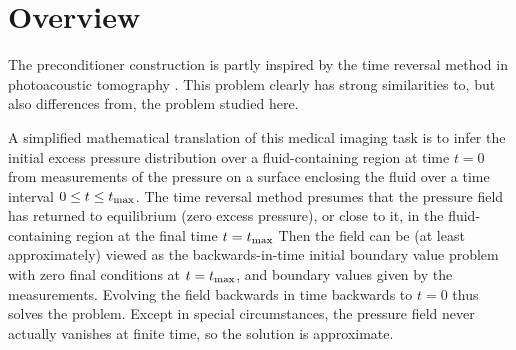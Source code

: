 \documentclass[georeport,12pt]{geophysics}
\newcommand{\bff}{\mathbf{f}}
\newcommand{\bu}{\mathbf{u}}
\begin{document}

\section{Overview}

The preconditioner construction is partly inspired by the time
reversal method in photoacoustic tomography
\cite[]{StefanovUhlmannIP:09,Hristova:09}. This problem
clearly has strong similarities to, but also differences from, the
problem studied here.

A simplified mathematical
translation of this medical imaging task is to infer the initial
excess pressure distribution over a fluid-containing region at time
$t=0$ from measurements of the pressure on a surface enclosing the
fluid over a time interval $0 \le t \le t_{\rm max}$. The time reversal method presumes that the
pressure field has returned to equilibrium (zero excess pressure), or
close to it, in the fluid-containing region at the
final time $t=t_{\rm max}$ Then the field can be (at least
approximately) viewed as the backwards-in-time initial boundary value
problem with zero final conditions at $t=t_{\rm max}$, and boundary
values given by the measurements. Evolving the field backwards in time
backwards to $t=0$ thus solves the problem. Except in special
circumstances, the pressure field never actually vanishes at finite
time, so the solution is approximate.
\end{document}

